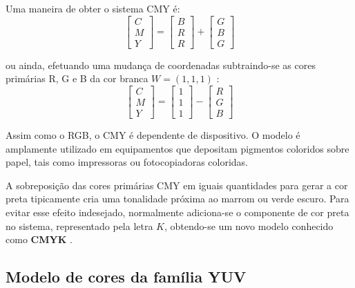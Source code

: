 Uma maneira de obter o sistema CMY é:\\
\begin{equation}
  \begin{bmatrix}
    C \\ M \\ Y
  \end{bmatrix} = 
  \begin{bmatrix}
    B \\ R \\ R
  \end{bmatrix} +
  \begin{bmatrix}
    G \\ B \\ G
  \end{bmatrix}
\end{equation}

ou ainda, efetuando uma mudança de coordenadas subtraindo-se as cores primárias R, G e B da cor branca $W = (1, 1, 1)$ \citep{gonzalez:02}:
\begin{equation}
  \begin{bmatrix}
    C \\ M \\ Y
  \end{bmatrix} = 
  \begin{bmatrix}
    1 \\ 1 \\ 1
  \end{bmatrix} -
  \begin{bmatrix}
    R \\ G \\ B
  \end{bmatrix}
\end{equation}

Assim como o RGB, o CMY é dependente de dispositivo. O modelo é amplamente utilizado em equipamentos que depositam pigmentos coloridos sobre papel, tais como impressoras ou fotocopiadoras coloridas.

A sobreposição das cores primárias CMY em iguais quantidades para gerar a cor preta tipicamente cria uma tonalidade próxima ao marrom ou verde escuro. Para evitar esse efeito indesejado, normalmente adiciona-se o componente de cor preta no sistema, representado pela letra $K$, obtendo-se um novo modelo conhecido como \textbf{CMYK} \citep{gonzalez:02}.

\subsection{Modelo de cores da família YUV}
\label{sec:modelo_cores_yuv}

